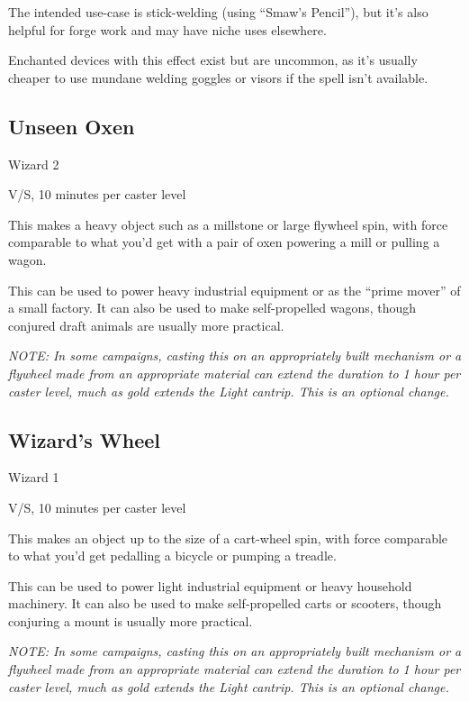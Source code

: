 The intended use-case is stick-welding (using ``Smaw's Pencil''), but it's
also helpful for forge work and may have niche uses elsewhere.

Enchanted devices with this effect exist but are uncommon, as it's usually
cheaper to use mundane welding goggles or visors if the spell isn't
available.
%

%
\subsection{Unseen Oxen}

Wizard 2

V/S, 10 minutes per caster level

This makes a heavy object such as a millstone or large flywheel spin, with
force comparable to what you'd get with a pair of oxen powering a mill or
pulling a wagon.

This can be used to power heavy industrial equipment or as the ``prime
mover'' of a small factory. It can also be used to make self-propelled
wagons, though conjured draft animals are usually more practical.

\textit{NOTE: In some campaigns, casting this on an appropriately built
mechanism or a flywheel made from an appropriate material can extend the
duration to 1 hour per caster level, much as gold extends the Light cantrip.
This is an optional change.}
%

%
\subsection{Wizard's Wheel}

Wizard 1

V/S, 10 minutes per caster level

This makes an object up to the size of a cart-wheel spin, with force
comparable to what you'd get pedalling a bicycle or pumping a treadle.

This can be used to power light industrial equipment or heavy household
machinery. It can also be used to make self-propelled carts or scooters,
though conjuring a mount is usually more practical.

\textit{NOTE: In some campaigns, casting this on an appropriately built
mechanism or a flywheel made from an appropriate material can extend the
duration to 1 hour per caster level, much as gold extends the Light cantrip.
This is an optional change.}
%

%
